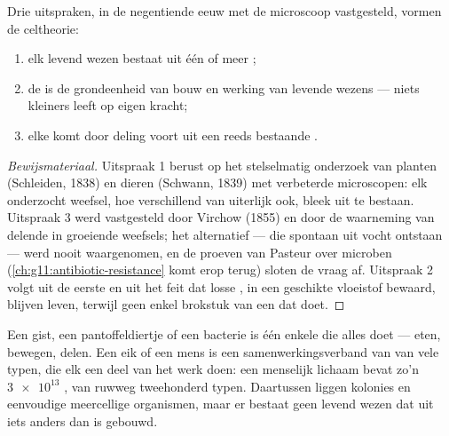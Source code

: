 \begin{proposition}[De celtheorie]\label{prop:g10:cells-common-unit:theory}
Drie uitspraken, in de negentiende eeuw met de microscoop vastgesteld,
vormen de celtheorie:
\begin{enumerate}
  \item elk levend wezen bestaat uit één of meer ;
  \item de  is de grondeenheid van bouw en werking van levende wezens
        --- niets kleiners leeft op eigen kracht;
  \item elke  komt door deling voort uit een reeds bestaande .
\end{enumerate}
\end{proposition}
\begin{proof}[Bewijsmateriaal]
Uitspraak 1 berust op het stelselmatig onderzoek van planten (Schleiden,
1838) en dieren (Schwann, 1839) met verbeterde microscopen: elk
onderzocht weefsel, hoe verschillend van uiterlijk ook, bleek uit 
te bestaan. Uitspraak 3 werd vastgesteld door Virchow (1855) en door de
waarneming van delende  in groeiende weefsels; het alternatief ---
 die spontaan uit vocht ontstaan --- werd nooit waargenomen, en de
proeven van Pasteur over microben (\cref{ch:g11:antibiotic-resistance}
komt erop terug) sloten de vraag af. Uitspraak 2 volgt uit de eerste en
uit het feit dat losse , in een geschikte vloeistof bewaard,
blijven leven, terwijl geen enkel brokstuk van een  dat doet.
\end{proof}

\begin{example}\label{ex:g10:cells-common-unit:onemany}
Een gist, een pantoffeldiertje of een bacterie is één enkele  die
alles doet --- eten, bewegen, delen. Een eik of een mens is een
samenwerkingsverband van  van vele typen, die elk een deel van
het werk doen: een menselijk lichaam bevat zo'n $\num{3e13}$ , van
ruwweg tweehonderd typen. Daartussen liggen kolonies en eenvoudige
meercellige organismen, maar er bestaat geen levend wezen dat uit iets
anders dan  is gebouwd.
\end{example}

